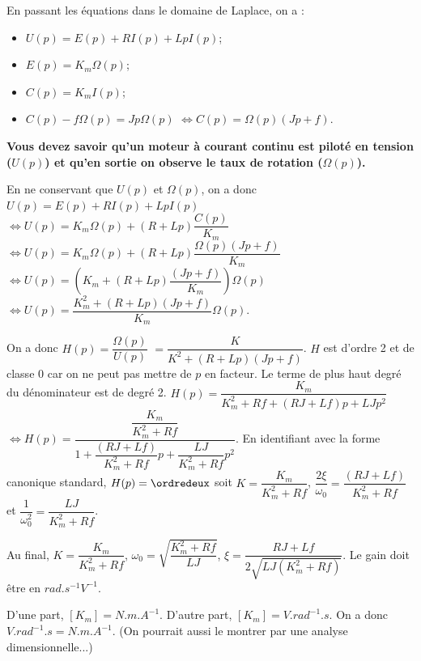 \begin{corrigebox}
En passant les équations dans le domaine de Laplace, on a : 
\begin{itemize}
\item $U(p) = E(p)+ RI(p) +LpI(p)$;
\item $E(p)=K_m\Omega(p)$;
\item $C(p)=K_mI(p)$;
\item $C(p)- f\Omega(p)=Jp\Omega(p)$ $\Leftrightarrow C(p)=\Omega(p)\left( Jp +f \right)$.
\end{itemize}

\textbf{Vous devez savoir qu'un moteur à courant continu est piloté en tension ($U(p)$) et qu'en sortie on observe le taux de rotation ($\Omega(p)$). }

En ne conservant que $U(p)$ et $\Omega(p)$, on a donc
$U(p) = E(p)+ RI(p) +LpI(p)$
$ \Leftrightarrow U(p) = K_m\Omega(p)+ \left(R +Lp\right)\dfrac{C(p)}{K_m}$
$ \Leftrightarrow U(p) = K_m\Omega(p)+ \left(R +Lp\right)\dfrac{\Omega(p)\left( Jp +f \right)}{K_m}$
$ \Leftrightarrow U(p) = \left(K_m+ \left(R +Lp\right)\dfrac{\left( Jp +f \right)}{K_m}\right)\Omega(p)$
$ \Leftrightarrow U(p) =  \dfrac{K_m^2 + \left(R +Lp\right)\left( Jp +f \right)}{K_m}\Omega(p)$.

On a donc $H(p)=\dfrac{\Omega(p)}{U(p)}$ $=\dfrac{K}{K^2 +\left(R +Lp\right) \left( Jp +f \right)} $.
$H$ est d'ordre 2 et de classe 0 car on ne peut pas mettre de $p$ en facteur. Le terme de plus haut degré du dénominateur est de degré 2.
$H(p)=\dfrac{K_m}{K_m^2+ Rf +\left(RJ  + Lf\right) p + LJp^2 } $
$\Leftrightarrow H(p)=\dfrac{\dfrac{K_m}{K_m^2+ Rf}}{1 +\dfrac{\left(RJ  + Lf\right)}{K_m^2+ Rf} p + \dfrac{LJ}{K_m^2+ Rf}p^2 } $.
En identifiant avec la forme canonique standard, $H(p)=\ordredeux$ soit
$K = \dfrac{K_m}{K_m^2+ Rf}$, $\dfrac{2\xi}{\omega_0} = \dfrac{\left(RJ  + Lf\right)}{K_m^2+ Rf}$ et $\dfrac{1}{\omega_0^2}=\dfrac{LJ}{K_m^2+ Rf}$.

Au final,
$K = \dfrac{K_m}{K_m^2+ Rf}$,
$\omega_0=\sqrt{\dfrac{K_m^2+ Rf}{LJ}}$,
$\xi = \dfrac{RJ  + Lf}{2\sqrt{{LJ\left(K_m^2+ Rf\right)}}}$.
Le gain doit être en $\si{rad.s^{-1}V^{-1}}$.

D'une part, $[K_m]=\si{N.m.A^{-1}}$. D'autre part, $[K_m]=\si{V.rad^{-1}.s}$. On a donc $\si{V.rad^{-1}.s}=\si{N.m.A^{-1}}$. (On pourrait aussi le montrer par une analyse dimensionnelle...)


\end{corrigebox}
